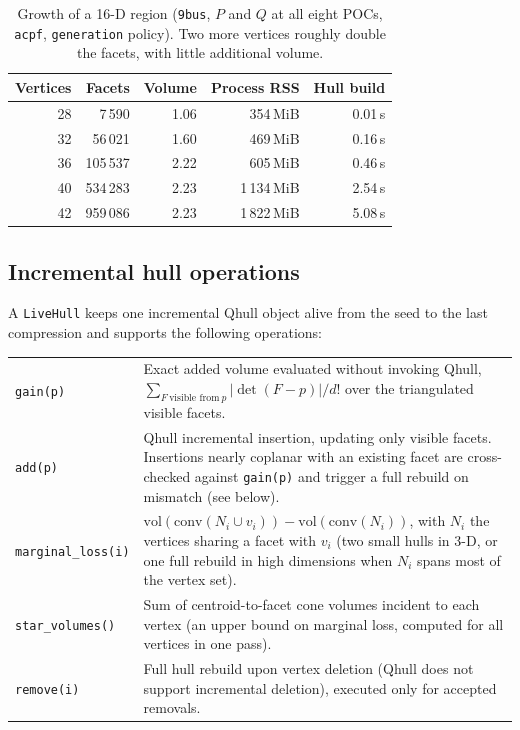 \documentclass[11pt,a4paper]{report}
\newcommand{\code}[1]{\texttt{\small #1}}
\begin{document}
\begin{table}[h]
\centering\small
\caption{Growth of a 16-D region (\code{9bus}, $P$ and $Q$ at all eight POCs,
\code{acpf}, \code{generation} policy). Two more vertices roughly double the
facets, with little additional volume.}
\label{tab:facetgrowth}
\begin{tabular}{@{}rrrrr@{}}
\toprule
Vertices & Facets & Volume & Process RSS & Hull build \\
\midrule
28 & 7\,590     & 1.06 & 354\,MiB   & 0.01\,s \\
32 & 56\,021    & 1.60 & 469\,MiB   & 0.16\,s \\
36 & 105\,537   & 2.22 & 605\,MiB   & 0.46\,s \\
40 & 534\,283   & 2.23 & 1\,134\,MiB & 2.54\,s \\
42 & 959\,086   & 2.23 & 1\,822\,MiB & 5.08\,s \\
\bottomrule
\end{tabular}
\end{table}

\subsection{Incremental hull operations}
\label{sec:livehull}

A \code{LiveHull} keeps one incremental Qhull object alive from the seed to the
last compression and supports the following operations:

\begin{center}\small
\begin{tabular}{@{}l>{\raggedright\arraybackslash}p{10.2cm}@{}}
\toprule
\code{gain(p)} & Exact added volume evaluated without invoking Qhull,
  $\sum_{F\ \text{visible from}\ p} |\det(F-p)|/d!$ over the triangulated
  visible facets. \\
\code{add(p)} & Qhull incremental insertion, updating only visible facets.
  Insertions nearly coplanar with an existing facet are cross-checked against
  \code{gain(p)} and trigger a full rebuild on mismatch (see below). \\
\code{marginal\_loss(i)} & $\mathrm{vol}(\mathrm{conv}(N_i\cup v_i)) -
  \mathrm{vol}(\mathrm{conv}(N_i))$, with $N_i$ the vertices sharing a facet with
  $v_i$ (two small hulls in 3-D, or one full rebuild in high dimensions when
  $N_i$ spans most of the vertex set). \\
\code{star\_volumes()} & Sum of centroid-to-facet cone volumes incident to each
  vertex (an upper bound on marginal loss, computed for all vertices in one pass). \\
\code{remove(i)} & Full hull rebuild upon vertex deletion (Qhull does not
  support incremental deletion), executed only for accepted removals. \\
\bottomrule
\end{tabular}
\end{center}
\end{document}
